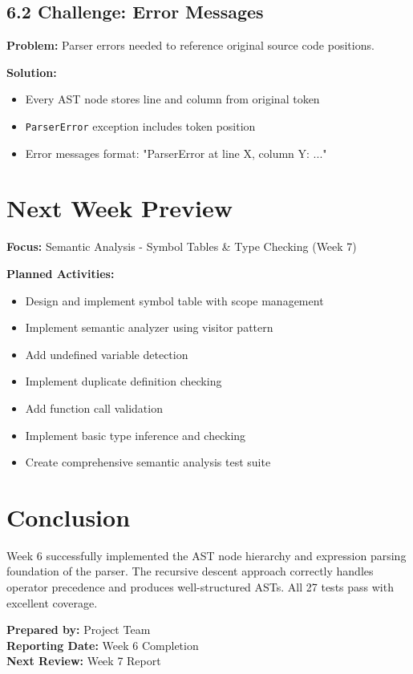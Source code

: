\documentclass[a4paper,11pt]{article}
\begin{document}
\subsection{6.2 Challenge: Error Messages}

\textbf{Problem:} Parser errors needed to reference original source code positions.

\textbf{Solution:}
\begin{itemize}[leftmargin=*]
    \item Every AST node stores line and column from original token
    \item \texttt{ParserError} exception includes token position
    \item Error messages format: "ParserError at line X, column Y: ..."
\end{itemize}

\section{Next Week Preview}

\textbf{Focus:} Semantic Analysis - Symbol Tables \& Type Checking (Week 7)

\textbf{Planned Activities:}
\begin{itemize}[leftmargin=*]
    \item Design and implement symbol table with scope management
    \item Implement semantic analyzer using visitor pattern
    \item Add undefined variable detection
    \item Implement duplicate definition checking
    \item Add function call validation
    \item Implement basic type inference and checking
    \item Create comprehensive semantic analysis test suite
\end{itemize}

\section{Conclusion}

Week 6 successfully implemented the AST node hierarchy and expression parsing foundation of the parser. The recursive descent approach correctly handles operator precedence and produces well-structured ASTs. All 27 tests pass with excellent coverage.

\vspace{5mm}
\noindent\textbf{Prepared by:} Project Team \\
\textbf{Reporting Date:} Week 6 Completion \\
\textbf{Next Review:} Week 7 Report
\end{document}
